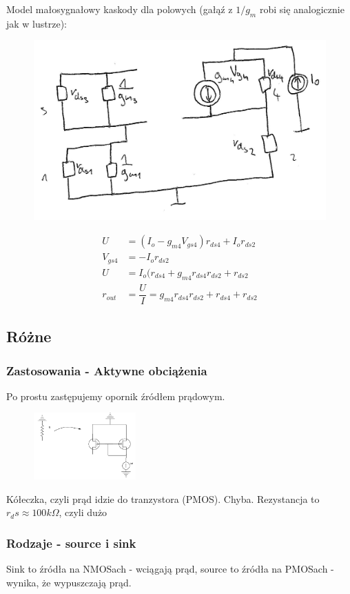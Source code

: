 \documentclass[10pt,a4paper]{article}
\begin{document}
Model małosygnałowy kaskody dla polowych (gałąź z $1/g_{m}$ robi się analogicznie jak w lustrze):
\begin{figure}[H]
\centering
\includegraphics[scale=0.8]{kaskoda_wypr}
\end{figure}
\begin{align*}
U&=(I_o-g_{m4}V_{gs4})r_{ds4}+I_o r_{ds2} \\
V_{gs4}&=-I_o r_{ds2} \\
U&=I_o(r_{ds4}+g_{m4}r_{ds4}r_{ds2}+r_{ds2} \\
r_{out}&=\dfrac{U}{I}=g_{m4}r_{ds4}r_{ds2}+r_{ds4}+r_{ds2}
\end{align*}

\subsection{Różne}
\subsubsection{Zastosowania - Aktywne obciążenia}
Po prostu zastępujemy opornik źródłem prądowym.
\begin{figure}[H]
\centering
\includegraphics[width=0.35\textwidth]{lustroZast}
\end{figure}
Kółeczka, czyli prąd idzie do tranzystora (PMOS). Chyba. Rezystancja to $r_ds \approx 100k \Omega$, czyli dużo 

\subsubsection{Rodzaje - source i sink}
Sink to źródła na NMOSach - wciągają prąd, source to źródła na PMOSach - wynika, że wypuszczają prąd.
\end{document}

